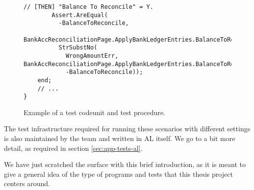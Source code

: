 \begin{figure}
\begin{Verbatim}[fontsize=\tiny]
        // [THEN] "Balance To Reconcile" = Y.
        Assert.AreEqual(
          -BalanceToReconcile,
          BankAccReconciliationPage.ApplyBankLedgerEntries.BalanceToReconcile.AsDEcimal,
          StrSubstNo(
            WrongAmountErr, BankAccReconciliationPage.ApplyBankLedgerEntries.BalanceToReconcile.Caption,
            -BalanceToReconcile));
    end;
    // ...
}
    \end{Verbatim}
    \caption{Example of a test codeunit and test procedure.}
    \label{f:app-al-test}
\end{figure}

The test infrastructure required for running these scenarios with different settings is also maintained
by the team and written in AL itself. We go to a bit more detail, as required in section \ref{sec:app-tests-al}.

We have just scratched the surface with this brief introduction, as it is meant to give a general idea of the
type of programs and tests that this thesis project centers around.